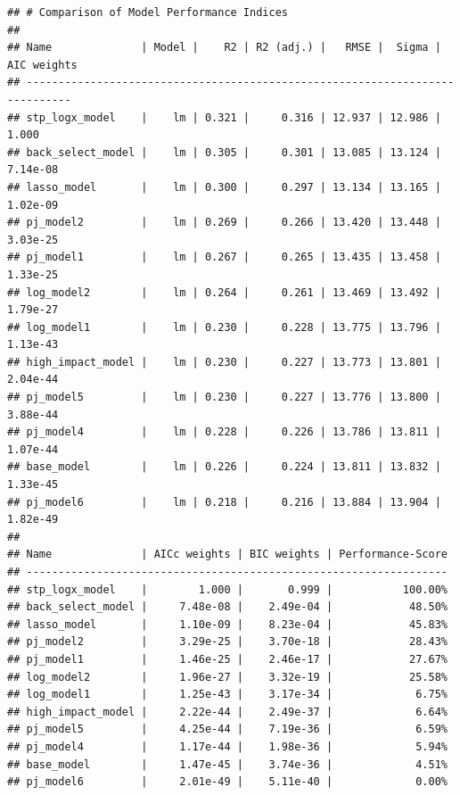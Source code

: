 \documentclass[
]{article}
\newenvironment{Shaded}{\begin{snugshade}}{\end{snugshade}}
\newcommand{\CommentTok}[1]{\textcolor[rgb]{0.56,0.35,0.01}{\textit{#1}}}
\newcommand{\FunctionTok}[1]{\textcolor[rgb]{0.13,0.29,0.53}{\textbf{#1}}}
\newcommand{\NormalTok}[1]{#1}
\newcommand{\OtherTok}[1]{\textcolor[rgb]{0.56,0.35,0.01}{#1}}
\newcommand{\SpecialCharTok}[1]{\textcolor[rgb]{0.81,0.36,0.00}{\textbf{#1}}}
\begin{document}
\begin{verbatim}
## # Comparison of Model Performance Indices
## 
## Name              | Model |    R2 | R2 (adj.) |   RMSE |  Sigma | AIC weights
## -----------------------------------------------------------------------------
## stp_logx_model    |    lm | 0.321 |     0.316 | 12.937 | 12.986 |       1.000
## back_select_model |    lm | 0.305 |     0.301 | 13.085 | 13.124 |    7.14e-08
## lasso_model       |    lm | 0.300 |     0.297 | 13.134 | 13.165 |    1.02e-09
## pj_model2         |    lm | 0.269 |     0.266 | 13.420 | 13.448 |    3.03e-25
## pj_model1         |    lm | 0.267 |     0.265 | 13.435 | 13.458 |    1.33e-25
## log_model2        |    lm | 0.264 |     0.261 | 13.469 | 13.492 |    1.79e-27
## log_model1        |    lm | 0.230 |     0.228 | 13.775 | 13.796 |    1.13e-43
## high_impact_model |    lm | 0.230 |     0.227 | 13.773 | 13.801 |    2.04e-44
## pj_model5         |    lm | 0.230 |     0.227 | 13.776 | 13.800 |    3.88e-44
## pj_model4         |    lm | 0.228 |     0.226 | 13.786 | 13.811 |    1.07e-44
## base_model        |    lm | 0.226 |     0.224 | 13.811 | 13.832 |    1.33e-45
## pj_model6         |    lm | 0.218 |     0.216 | 13.884 | 13.904 |    1.82e-49
## 
## Name              | AICc weights | BIC weights | Performance-Score
## ------------------------------------------------------------------
## stp_logx_model    |        1.000 |       0.999 |           100.00%
## back_select_model |     7.48e-08 |    2.49e-04 |            48.50%
## lasso_model       |     1.10e-09 |    8.23e-04 |            45.83%
## pj_model2         |     3.29e-25 |    3.70e-18 |            28.43%
## pj_model1         |     1.46e-25 |    2.46e-17 |            27.67%
## log_model2        |     1.96e-27 |    3.32e-19 |            25.58%
## log_model1        |     1.25e-43 |    3.17e-34 |             6.75%
## high_impact_model |     2.22e-44 |    2.49e-37 |             6.64%
## pj_model5         |     4.25e-44 |    7.19e-36 |             6.59%
## pj_model4         |     1.17e-44 |    1.98e-36 |             5.94%
## base_model        |     1.47e-45 |    3.74e-36 |             4.51%
## pj_model6         |     2.01e-49 |    5.11e-40 |             0.00%
\end{verbatim}

\begin{Shaded}
\end{Shaded}
\end{document}
